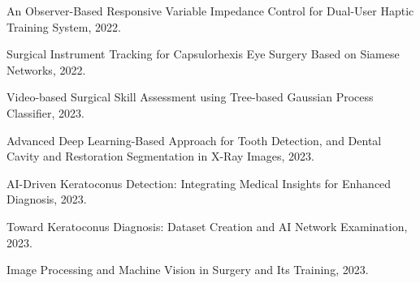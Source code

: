 \documentclass[11pt,a4paper,sans]{moderncv} %
\begin{document}
    \href{https://ieeexplore.ieee.org/abstract/document/9981977/}{\textcolor{gray}{\faCloudDownload} }An Observer-Based Responsive Variable Impedance Control for Dual-User Haptic Training System, 2022.

    \href{https://ieeexplore.ieee.org/abstract/document/10025355/}{\textcolor{gray}{\faCloudDownload} }Surgical Instrument Tracking for Capsulorhexis Eye Surgery Based on Siamese Networks, 2022.
 
    \href{https://arxiv.org/abs/2312.10208}{\textcolor{gray}{\faCloudDownload} }Video-based Surgical Skill Assessment using Tree-based Gaussian Process Classifier, 2023.


    \href{https://ieeexplore.ieee.org/abstract/document/10412537/}{\textcolor{gray}{\faCloudDownload} }Advanced Deep Learning-Based Approach for Tooth Detection, and Dental Cavity and Restoration Segmentation in X-Ray Images, 2023.
 
    \href{https://ieeexplore.ieee.org/abstract/document/10412506/}{\textcolor{gray}{\faCloudDownload} }AI-Driven Keratoconus Detection: Integrating Medical Insights for Enhanced Diagnosis, 2023.	
 
    \href{https://ieeexplore.ieee.org/abstract/document/10412590/}{\textcolor{gray}{\faCloudDownload} }Toward Keratoconus Diagnosis: Dataset Creation and AI Network Examination, 2023.
 
	\href{https://joc.kntu.ac.ir/article-1-999-en.html}{\textcolor{gray}{\faCloudDownload} }Image Processing and Machine Vision in Surgery and Its Training, 2023.	
\end{document}
